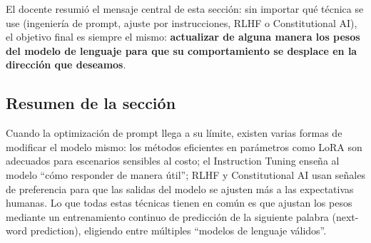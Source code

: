 El docente resumió el mensaje central de esta sección: sin importar qué técnica se use (ingeniería de prompt, ajuste por instrucciones, RLHF o Constitutional AI), el objetivo final es siempre el mismo: \textbf{actualizar de alguna manera los pesos del modelo de lenguaje para que su comportamiento se desplace en la dirección que deseamos}.

\subsection{Resumen de la sección}

Cuando la optimización de prompt llega a su límite, existen varias formas de modificar el modelo mismo: los métodos eficientes en parámetros como LoRA son adecuados para escenarios sensibles al costo; el Instruction Tuning enseña al modelo ``cómo responder de manera útil''; RLHF y Constitutional AI usan señales de preferencia para que las salidas del modelo se ajusten más a las expectativas humanas. Lo que todas estas técnicas tienen en común es que ajustan los pesos mediante un entrenamiento continuo de predicción de la siguiente palabra (next-word prediction), eligiendo entre múltiples ``modelos de lenguaje válidos''.

